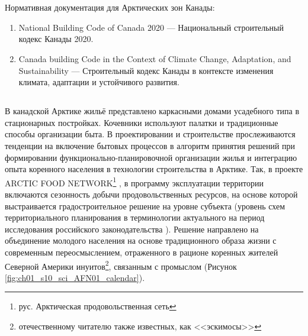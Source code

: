 \section{}





\subsection{\scAssesmentBuildingLaw}
% 
Нормативная документация для Арктических зон Канады:
\begin{enumerate}[1.]
    \item National Building Code of Canada 2020 --- Национальный строительный кодекс Канады 2020.
    \item Canada building Code in the Context of Climate Change, Adaptation, and Sustainability --- Строительный кодекс Канады в контексте изменения климата, адаптации и устойчивого развития.
\end{enumerate}



\subsection{\scAssesmentExp}

В канадской Арктике жильё представлено каркасными домами усадебного типа в стационарных постройках. Кочевники используют палатки и традиционные способы организации быта.
В проектировании и строительстве прослеживаются тенденции на включение бытовых процессов в алгоритм принятия решений при формировании функционально-планировочной организации жилья
и интеграцию опыта коренного населения в технологии строительства в Арктике.
Так, в проекте ARCTIC FOOD NETWORK\footnote{рус. Арктическая продовольственная сеть} \cite{2012_nomads_Canada_AFN}, в программу эксплуатации территории включаются сезонность добычи продовольственных ресурсов, на основе которой выстраивается градостроительное решение на уровне субъекта (уровень схем территориального планирования в терминологии актуального на период исследования российского законодательства \cite{law_RU_GradoCodex}).
Решение направлено на объединение молодого населения на основе традиционного образа жизни с современным переосмыслением, отраженного в рационе коренных жителей Северной Америки инуитов\footnote{отечественному читателю также известных, как <<эскимосы>>}, связанным с промыслом (Рисунок \ref{fig:ch01_s10_sci_AFN01_calendar}).

